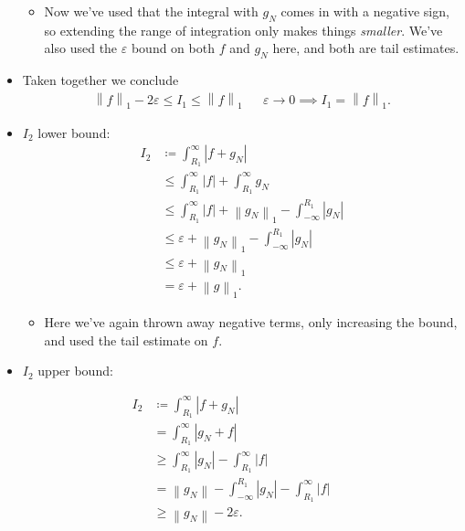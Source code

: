 \begin{solution}
\begin{itemize}
  \begin{itemize}
  \tightlist
  \item
    Now we've used that the integral with \(g_N\) comes in with a
    negative sign, so extending the range of integration only makes
    things \emph{smaller}. We've also used the \({\varepsilon}\) bound
    on both \(f\) and \(g_N\) here, and both are tail estimates.
  \end{itemize}
\item
  Taken together we conclude
  \begin{align*}
  {\left\lVert {f} \right\rVert}_1 - 2{\varepsilon}
  \leq I_1
  \leq {\left\lVert {f} \right\rVert}_1 && {\varepsilon}\to 0 \implies  I_1 = {\left\lVert {f} \right\rVert}_1
  .\end{align*}
\item
  \(I_2\) lower bound:
  \begin{align*}
  I_2 
  &\coloneqq\int_{R_1}^{\infty} {\left\lvert {f + g_N} \right\rvert} \\
  &\leq \int_{R_1}^{\infty} {\left\lvert {f} \right\rvert} + \int_{R_1}^{\infty} {g_N} \\
  &\leq \int_{R_1}^{\infty} {\left\lvert {f} \right\rvert} + {\left\lVert {g_N} \right\rVert}_1 - \int_{-\infty}^{R_1} {\left\lvert {g_N} \right\rvert} \\
  &\leq {\varepsilon}+ {\left\lVert {g_N} \right\rVert}_1 - \int_{-\infty}^{R_1} {\left\lvert {g_N} \right\rvert} \\
  &\leq {\varepsilon}+ {\left\lVert {g_N} \right\rVert}_1 \\
  &= {\varepsilon}+ {\left\lVert {g} \right\rVert}_1 
  .\end{align*}

  \begin{itemize}
  \tightlist
  \item
    Here we've again thrown away negative terms, only increasing the
    bound, and used the tail estimate on \(f\).
  \end{itemize}
\item
  \(I_2\) upper bound:
\end{itemize}

\begin{align*}
I_2 
&\coloneqq\int_{R_1}^{\infty} {\left\lvert {f + g_N} \right\rvert} \\
&= \int_{R_1}^{\infty} {\left\lvert {g_N + f} \right\rvert} \\
&\geq \int_{R_1}^{\infty} {\left\lvert {g_N} \right\rvert} - \int_{R_1}^{\infty} {\left\lvert {f} \right\rvert} \\
&=  {\left\lVert {g_N} \right\rVert} - \int_{-\infty}^{R_1} {\left\lvert {g_N} \right\rvert} - \int_{R_1}^{\infty} {\left\lvert {f} \right\rvert} \\
&\geq  {\left\lVert {g_N} \right\rVert} - 2{\varepsilon}
.\end{align*}


\end{solution}
